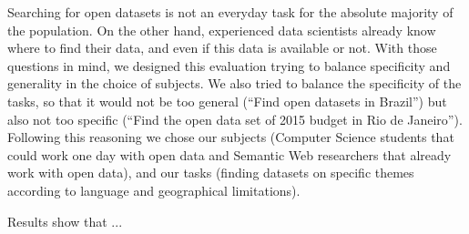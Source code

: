 Searching for open datasets is not an everyday task for the absolute majority of the population.
On the other hand, experienced data scientists already know where to find their data, and even if this data is available or not.
With those questions in mind, we designed this evaluation trying to balance specificity and generality in the choice of subjects.
We also tried to balance the specificity of the tasks, so that it would not be too general (``Find open datasets in Brazil'') but also not too specific (``Find the open data set of 2015 budget in Rio de Janeiro'').
Following this reasoning we chose our subjects (Computer Science students that could work one day with open data and Semantic Web researchers that already work with open data), and our tasks (finding datasets on specific themes according to language and geographical limitations).

Results show that ...




